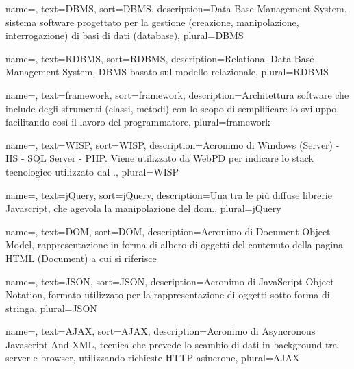 {
	name=,
	text=DBMS,
	sort=DBMS,
	description={Data Base Management System, sistema software progettato per la gestione (creazione, manipolazione, interrogazione) di basi di dati (database)\cite{site:dbms}},
	plural=DBMS
}

{
	name=,
	text=RDBMS,
	sort=RDBMS,
	description={Relational Data Base Management System, DBMS basato sul modello relazionale\cite{site:rdbms}},
	plural=RDBMS
}


{
	name=,
	text=framework,
	sort=framework,
	description={Architettura software che include degli strumenti (classi, metodi) con lo scopo di semplificare lo sviluppo, facilitando così il lavoro del programmatore\cite{site:framework}},
	plural=framework
}


{
	name=,
	text=WISP,
	sort=WISP,
	description={Acronimo di Windows (Server) - IIS - SQL Server - PHP. Viene utilizzato da WebPD per indicare lo stack tecnologico utilizzato dal \bookingEngine.},
	plural=WISP
}


{
	name=,
	text=jQuery,
	sort=jQuery,
	description={Una tra le più diffuse librerie Javascript, che agevola la manipolazione del \gls{dom}.},
	plural=jQuery
}

{
	name=,
	text=DOM,
	sort=DOM,
	description={Acronimo di Document Object Model, rappresentazione in forma di albero di oggetti del contenuto della pagina HTML (Document) a cui si riferisce\cite{site:dom}}
}

{
	name=,
	text=JSON,
	sort=JSON,
	description={Acronimo di JavaScript Object Notation, formato utilizzato per la rappresentazione di oggetti sotto forma di stringa\cite{site:json}},
	plural=JSON
}


{
	name=,
	text=AJAX,
	sort=AJAX,
	description={Acronimo di Asyncronous Javascript And XML, tecnica che prevede lo scambio di dati in background tra server e browser, utilizzando richieste HTTP asincrone\cite{site:ajax}},
	plural=AJAX
}
